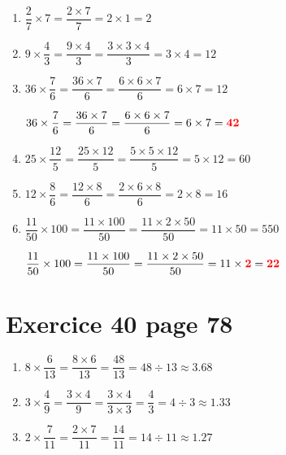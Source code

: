 \documentclass[12pt,a4paper]{article}
\begin{document}
\begin{enumerate}
	\item $\dfrac{2}{7} \times 7 = \dfrac{2 \times 7}{7} =  2 \times 1 = 2$ %
	
	\vspace*{0.5cm}
	\item $9 \times \dfrac{4}{3} = \dfrac{9 \times 4}{3} =  \dfrac{3 \times 3 \times 4}{3} = 3 \times 4 = 12$
	
	\vspace*{0.5cm}
	\item $36 \times \dfrac{7}{6} = \dfrac{36 \times 7}{6} = \dfrac{6 \times 6 \times 7}{6} = 6 \times 7 = 12$
	
	\vspace*{0.35cm}
	
	$36 \times \dfrac{7}{6} = \dfrac{36 \times 7}{6} = \dfrac{6 \times 6 \times 7}{6} = 6 \times 7 = \textcolor{red}{\mathbf{42}}$
	
	\vspace*{0.5cm}
	\item $25 \times \dfrac{12}{5} = \dfrac{25 \times 12}{5} = \dfrac{5 \times 5 \times 12}{5} = 5 \times 12 = 60$
	
	\vspace*{0.5cm}
	\item $12 \times \dfrac{8}{6} = \dfrac{12 \times 8}{6} = \dfrac{2 \times 6 \times 8}{6} = 2 \times 8 = 16$
	
	\vspace*{0.5cm}
	\item $\dfrac{11}{50} \times 100 = \dfrac{11 \times 100}{50} = \dfrac{11 \times 2 \times 50}{50} =  11 \times 50 = 550$ 
	
	\vspace*{0.35cm}
	$\dfrac{11}{50} \times 100 = \dfrac{11 \times 100}{50} = \dfrac{11 \times 2 \times 50}{50} =  11 \times \textcolor{red}{\mathbf{2}} = \textcolor{red}{\mathbf{22}}$ 
\end{enumerate}


\section*{Exercice 40 page 78}

\begin{enumerate}
	\item $8 \times \dfrac{6}{13} = \dfrac{8 \times 6}{13} = \dfrac{48}{13} = 48 \div 13 \approx \num{3.68}$
	
	\vspace*{0.5cm}
	\item $3 \times \dfrac{4}{9} = \dfrac{3 \times 4}{9} = \dfrac{3 \times 4}{3 \times 3} = \dfrac{4}{3} = 4 \div 3  \approx \num{1.33}$
	
	\vspace*{0.5cm}
	\item $2 \times \dfrac{7}{11} = \dfrac{2 \times 7}{11} = \dfrac{14}{11} =  14 \div 11  \approx \num{1.27}$
\end{enumerate}
\end{document}
